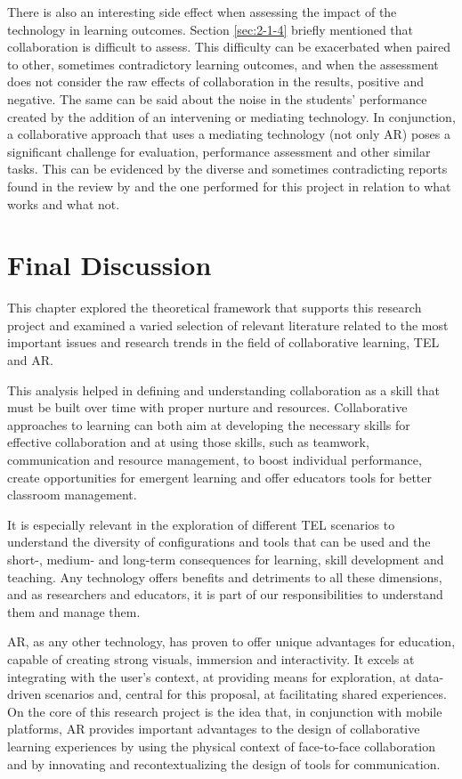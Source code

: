 There is also an interesting side effect when assessing the impact of the technology in learning outcomes. Section \ref{sec:2-1-4} briefly mentioned that collaboration is difficult to
assess. This difficulty can be exacerbated when paired to other, sometimes contradictory learning outcomes, and when the assessment does not consider the raw effects of collaboration in the
results, positive and negative. The same can be said about the noise in the students' performance created by the addition of an intervening or mediating technology. In conjunction, a
collaborative approach that uses a mediating technology (not only \ac{AR}) poses a significant challenge for evaluation, performance assessment and other similar tasks. This can be
evidenced by the diverse and sometimes contradicting reports found in the review by \textcite{upadhyay_2024} and the one performed for this project in relation to what works and what not.

\section{Final Discussion \label{sec:2-4}}

This chapter explored the theoretical framework that supports this research project and examined a varied selection of relevant literature related to the most important issues and research
trends in the field of collaborative learning, \ac{TEL} and \ac{AR}.

This analysis helped in defining and understanding collaboration as a skill that must be built over time with proper nurture and resources. Collaborative approaches to learning can both
aim at developing the necessary skills for effective collaboration and at using those skills, such as teamwork, communication and resource management, to boost individual performance,
create opportunities for emergent learning and offer educators tools for better classroom management.

It is especially relevant in the exploration of different \ac{TEL} scenarios to understand the diversity of configurations and tools that can be used and the short-, medium- and long-term
consequences for learning, skill development and teaching. Any technology offers benefits and detriments to all these dimensions, and as researchers and educators, it is part of our
responsibilities to understand them and manage them.

\ac{AR}, as any other technology, has proven to offer unique advantages for education, capable of creating strong visuals, immersion and interactivity. It excels at integrating with the
user's context, at providing means for exploration, at data-driven scenarios and, central for this proposal, at facilitating shared experiences. On the core of this research project is the
idea that, in conjunction with mobile platforms, \ac{AR} provides important advantages to the design of collaborative learning experiences by using the physical context of face-to-face
collaboration and by innovating and recontextualizing the design of tools for communication.

